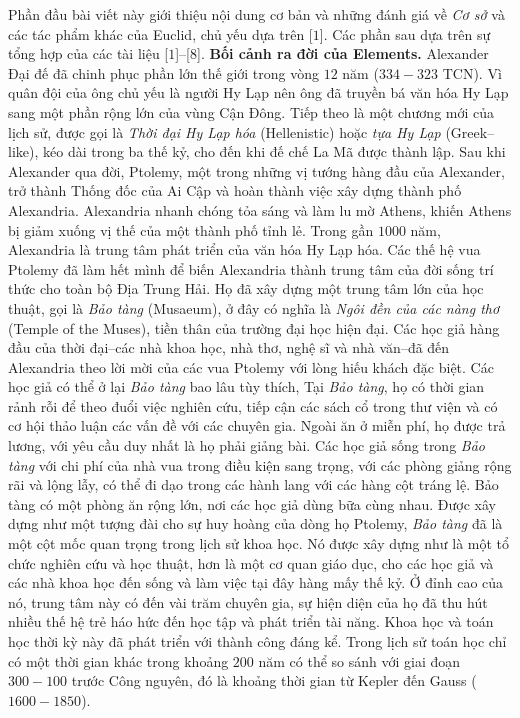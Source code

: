 \begin{multicols}{2}
	\vskip 0.1cm
	Phần đầu bài viết này giới thiệu nội dung cơ bản và những đánh giá về \textit{Cơ sở} và các tác phẩm khác của Euclid, chủ yếu dựa trên [$1$]. Các phần sau dựa trên sự tổng hợp của các tài liệu [$1$]--[$8$].
	\vskip 0.1cm
	\textbf{\color{lichsutoanhoc}Bối cảnh ra đời của Elements.}
	Alexander Đại đế đã chinh phục phần lớn thế giới trong vòng $12$ năm ($334-323$ TCN). Vì quân đội của ông chủ yếu là người Hy Lạp nên ông đã truyền bá văn hóa Hy Lạp sang một phần rộng lớn của vùng Cận Đông. Tiếp theo là một chương mới của lịch sử, được gọi là \textit{Thời đại Hy Lạp hóa} (Hellenistic) hoặc \textit{tựa Hy Lạp} (Greek--like), kéo dài trong ba thế kỷ, cho đến khi đế chế La Mã được thành lập.
	\vskip 0.1cm
	Sau khi Alexander qua đời, Ptolemy, một trong những vị tướng hàng đầu của Alexander, trở thành Thống đốc của Ai Cập và hoàn thành việc xây dựng thành phố Alexandria. Alexandria nhanh chóng tỏa sáng và làm lu mờ Athens, khiến Athens bị giảm xuống vị thế của một thành phố tỉnh lẻ. Trong gần $1000$ năm, Alexandria là trung tâm phát triển của văn hóa Hy Lạp hóa.
	\vskip 0.1cm
	Các thế hệ vua Ptolemy đã làm hết mình để biến Alexandria thành trung tâm của đời sống trí thức cho toàn bộ Địa Trung Hải. Họ đã xây dựng một trung tâm lớn của học thuật, gọi là \textit{Bảo tàng} (Musaeum), ở đây có nghĩa là \textit{Ngôi đền của các nàng thơ} (Temple of the Muses), tiền thân của trường đại học hiện đại. Các học giả hàng đầu của thời đại--các nhà khoa học, nhà thơ, nghệ sĩ và nhà văn--đã đến Alexandria theo lời mời của các vua Ptolemy với lòng hiếu khách đặc biệt. Các học giả có thể ở lại \textit{Bảo tàng} bao lâu tùy thích, Tại \textit{Bảo tàng}, họ có thời gian rảnh rỗi để theo đuổi việc nghiên cứu, tiếp cận các sách cổ trong thư viện và có cơ hội thảo luận các vấn đề với các chuyên gia.  Ngoài ăn ở miễn phí, họ được trả lương, với yêu cầu duy nhất là họ phải giảng bài. Các học giả sống trong \textit{Bảo tàng} với chi phí của nhà vua trong điều kiện sang trọng, với các phòng giảng rộng rãi và lộng lẫy, có thể đi dạo trong các hành lang với các hàng cột tráng lệ. Bảo tàng có một phòng ăn rộng lớn, nơi các học giả dùng bữa cùng nhau. 
	\vskip 0.1cm
	Được xây dựng như một tượng đài cho sự huy hoàng của dòng họ Ptolemy, \textit{Bảo tàng} đã là một cột mốc quan trọng trong lịch sử khoa học. Nó được xây dựng như là một tổ chức nghiên cứu và học thuật, hơn là một cơ quan giáo dục, cho các học giả và các nhà khoa học đến sống và làm việc tại đây hàng mấy thế kỷ. Ở đỉnh cao của nó, trung tâm này có đến vài trăm chuyên gia, sự hiện diện của họ đã thu hút nhiều thế hệ trẻ háo hức đến học tập và phát triển tài năng. Khoa học và toán học thời kỳ này đã phát triển với thành công đáng kể. Trong lịch sử toán học chỉ có một thời gian khác trong khoảng $200$ năm có thể so sánh với giai đoạn $300-100$ trước Công nguyên, đó là khoảng thời gian từ Kepler đến Gauss ($1600-1850$).

\end{multicols}

